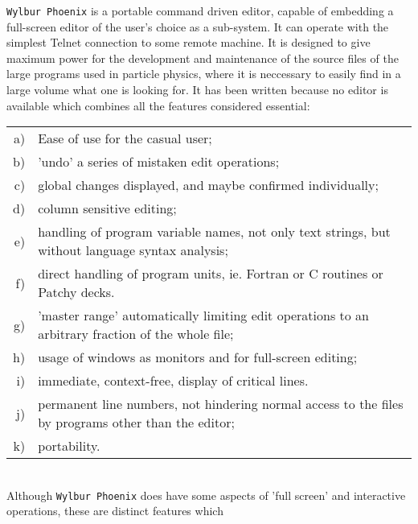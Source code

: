                     
   
\Submitter{}             
\begin{center}
\end{center}
{\tt Wylbur Phoenix} is a portable command driven editor, capable of
embedding a full-screen editor of the user's choice as a sub-system.
It can operate with the simplest Telnet connection to some
remote machine. It is designed to give maximum power for the development
and maintenance of the source files of the large programs used in
particle physics, where it is neccessary to easily find in a large
volume what one is looking for. It has been written because no editor
is available which combines all the features considered essential:
\begin{tabular}[t]{rl}
a) & Ease of use for the casual user; \\
b) & 'undo' a series of mistaken edit operations; \\
c) & global changes displayed, and maybe confirmed individually; \\
d) & column sensitive editing; \\
e) & handling of program variable names, not only text strings,
but without language syntax analysis; \\
f) & direct handling of program units, ie. Fortran or C routines
or Patchy decks. \\
g) & 'master range' automatically limiting edit operations to an
arbitrary fraction of the whole file; \\
h) & usage of windows as monitors and for full-screen editing; \\
i) & immediate, context-free, display of critical lines. \\
j) & permanent line numbers, not hindering normal access
to the files by programs other than the editor; \\
k) & portability.
\end{tabular} \\[2mm]
Although {\tt Wylbur Phoenix} does have some aspects of 'full screen'
and interactive operations, these are distinct features which
